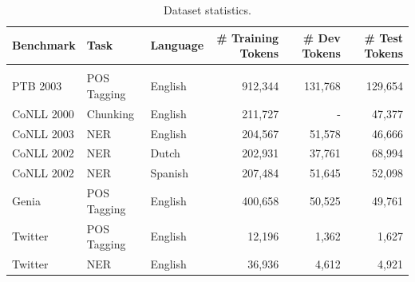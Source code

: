 \begin{table}[t]
\vspace{-0.1in}
\caption{\small Dataset statistics.}
\label{tab:stat}
\begin{center}
\begin{tabular}{lllrrr}
Benchmark & Task & Language & \# Training Tokens & \# Dev Tokens & \# Test Tokens
\\ \hline \\
PTB 2003 & POS Tagging & English &  912,344 & 131,768 & 129,654 \\
CoNLL 2000 & Chunking & English & 211,727 & - & 47,377 \\
CoNLL 2003 & NER & English & 204,567 & 51,578 & 46,666 \\
CoNLL 2002 & NER & Dutch & 202,931 & 37,761 & 68,994 \\
CoNLL 2002 & NER & Spanish & 207,484 & 51,645 & 52,098 \\
Genia & POS Tagging & English & 400,658 & 50,525 & 49,761 \\
Twitter & POS Tagging & English & 12,196 & 1,362 & 1,627 \\
Twitter & NER & English & 36,936 & 4,612 & 4,921 \\
\end{tabular}
\end{center}
\end{table}


